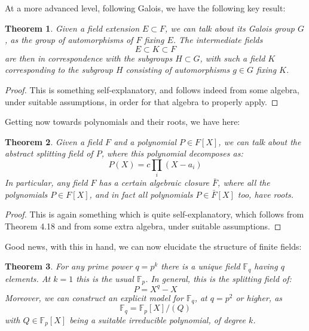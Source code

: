 \documentclass[12pt]{amsbook}
\newtheorem{theorem}{Theorem}[chapter]
\begin{document}
At a more advanced level, following Galois, we have the following key result:


\begin{theorem} 
Given a field extension $E\subset F$, we can talk about its Galois group $G$, as the group of automorphisms of $F$ fixing $E$. The intermediate fields
$$E\subset K\subset F$$
are then in correspondence with the subgroups $H\subset G$, with such a field $K$ corresponding to the subgroup $H$ consisting of automorphisms $g\in G$ fixing $K$.
\end{theorem}

\begin{proof}
This is something self-explanatory, and follows indeed from some algebra, under suitable assumptions, in order for that algebra to properly apply.
\end{proof}

Getting now towards polynomials and their roots, we have here:


\begin{theorem}
Given a field $F$ and a polynomial $P\in F[X]$, we can talk about the abstract splitting field of $P$, where this polynomial decomposes as:
$$P(X)=c\prod_i(X-a_i)$$
In particular, any field $F$ has a certain algebraic closure $\bar{F}$, where all the polynomials $P\in F[X]$, and in fact all polynomials $P\in\bar{F}[X]$ too, have roots.
\end{theorem}

\begin{proof}
This is again something which is quite self-explanatory, which follows from Theorem 4.18 and from some extra algebra, under suitable assumptions.
\end{proof}

Good news, with this in hand, we can now elucidate the structure of finite fields:


\begin{theorem}
For any prime power $q=p^k$ there is a unique field $\mathbb F_q$ having $q$ elements. At $k=1$ this is the usual $\mathbb F_p$. In general, this is the splitting field of:
$$P=X^q-X$$
Moreover, we can construct an explicit model for $\mathbb F_q$, at $q=p^2$ or higher, as
$$\mathbb F_q=\mathbb F_p[X]/(Q)$$
with $Q\in\mathbb F_p[X]$ being a suitable irreducible polynomial, of degree $k$. 
\end{theorem}
\end{document}
